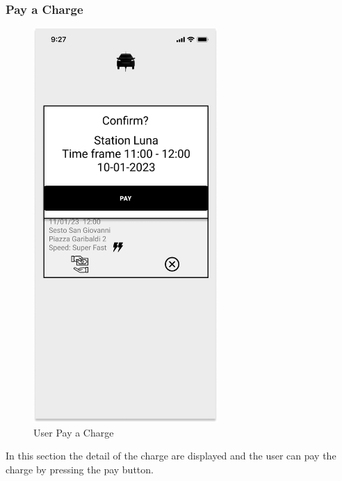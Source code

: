 \subsubsection{Pay a Charge}
\begin{figure}[H]
    \centering
    \includegraphics[keepaspectratio, height=15cm]{AppInterface/Pay Charge.png}
    \caption{User Pay a Charge}
    \label{pop:Pay}
\end{figure}
In this section the detail of the charge are displayed and the user can pay the charge by pressing the pay button.
